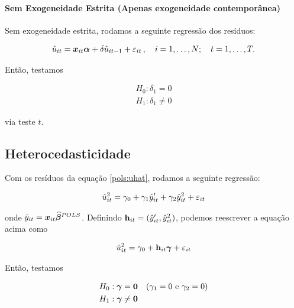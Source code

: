 \documentclass[11pt, oneside, a4paper, article]{article}
\numberwithin{equation}{section}
\begin{document}
\paragraph{Sem Exogeneidade Estrita (Apenas exogeneidade contemporânea)}
Sem exogeneidade estrita, rodamos a seguinte regressão dos resíduos:

\vspace{-1.5 em}
\begin{align*}
	\hat{u}_{it} = \boldsymbol{x}_{it} \boldsymbol{\alpha} + \delta \hat{u}_{it-1}  + \varepsilon_{it}
	\, , \quad i=1,\dots, N; \quad t=1,\dots, T.
\end{align*}

\noindent
Então, testamos

\vspace{-1 em}
\begin{align*}
	H_{0} : \delta_{1} = 0
	\\
	H_{1} : \delta_{1} \neq 0
\end{align*}

\noindent
via teste $t$. 

\subsection{Heterocedasticidade}
Com os resíduos da equação \eqref{pols:uhat}, rodamos a seguinte regressão:

\vspace{-1 em}
\begin{align*}
	\hat{u}^{2}_{it} = \gamma_{0} + \gamma_{1} \hat{y}_{it}' + \gamma_{2} \hat{y}^{2}_{it} + \varepsilon_{it}
\end{align*}

\noindent
onde $\hat{y}_{it} = \boldsymbol{x}_{it} \widehat{\boldsymbol{\beta}}^{POLS}$.
Definindo $\mathbf{h}_{it} = ( \hat{y}_{it}', \hat{y}^{2}_{it} )$, podemos reescrever a equação acima como

\vspace{-1 em}
\begin{align*}
	\hat{u}^{2}_{it} = \gamma_{0} + \mathbf{h}_{it} \boldsymbol{\gamma} + \varepsilon_{it}
\end{align*}

\noindent
Então, testamos

\vspace{-1 em}
\begin{align*}
	H_{0} &: \boldsymbol{\gamma} = \boldsymbol{0} \quad (\gamma_{1} = 0 \text{ e } \gamma_{2} = 0 )
	\\
	H_{1} &: \boldsymbol{\gamma} \neq \boldsymbol{0}
\end{align*}
\end{document}
